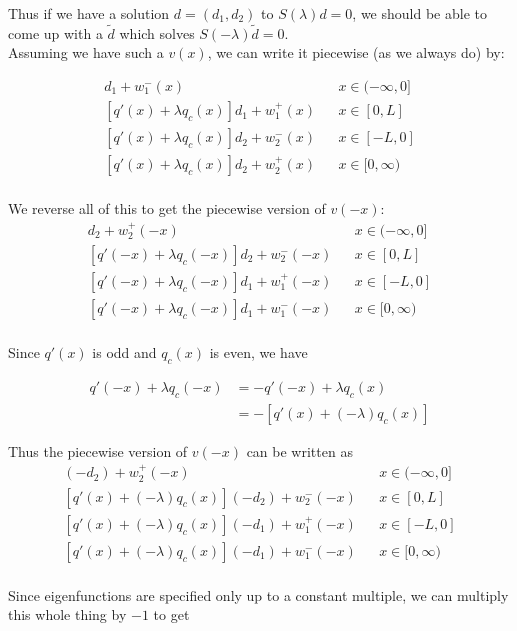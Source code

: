 \documentclass[12pt]{article}
\begin{document}
Thus if we have a solution $d = (d_1, d_2)$ to $S(\lambda)d = 0$, we should be able to come up with a $\tilde{d}$ which solves $S(-\lambda)\tilde{d} = 0$.\\

Assuming we have such a $v(x)$, we can write it piecewise (as we always do) by:

\begin{align*}
[q'(x) + \lambda q_c(x)]d_1 + w_1^-(x) && x \in (-\infty, 0] \\
[q'(x) + \lambda q_c(x)]d_1 + w_1^+(x) && x \in [0, L] \\
[q'(x) + \lambda q_c(x)]d_2 + w_2^-(x) && x \in [-L, 0] \\
[q'(x) + \lambda q_c(x)]d_2 + w_2^+(x) && x \in [0, \infty) \\
\end{align*}

We reverse all of this to get the piecewise version of $v(-x)$:
\begin{align*}
[q'(-x) + \lambda q_c(-x)]d_2 + w_2^+(-x) && x \in (-\infty, 0] \\
[q'(-x) + \lambda q_c(-x)]d_2 + w_2^-(-x) && x \in [0, L] \\
[q'(-x) + \lambda q_c(-x)]d_1 + w_1^+(-x) && x \in [-L, 0] \\
[q'(-x) + \lambda q_c(-x)]d_1 + w_1^-(-x) && x \in [0, \infty) \\
\end{align*}

Since $q'(x)$ is odd and $q_c(x)$ is even, we have

\begin{align*}
q'(-x) + \lambda q_c(-x) &= -q'(-x) + \lambda q_c(x) \\
&= -[q'(x) + (-\lambda)q_c(x)]
\end{align*}

Thus the piecewise version of $v(-x)$ can be written as
\begin{align*}
[q'(x) + (-\lambda) q_c(x)](-d_2) + w_2^+(-x) && x \in (-\infty, 0] \\
[q'(x) + (-\lambda) q_c(x)](-d_2) + w_2^-(-x) && x \in [0, L] \\
[q'(x) + (-\lambda) q_c(x)](-d_1) + w_1^+(-x) && x \in [-L, 0] \\
[q'(x) + (-\lambda) q_c(x)](-d_1) + w_1^-(-x) && x \in [0, \infty) \\
\end{align*}

Since eigenfunctions are specified only up to a constant multiple, we can multiply this whole thing by $-1$ to get
\end{document}
